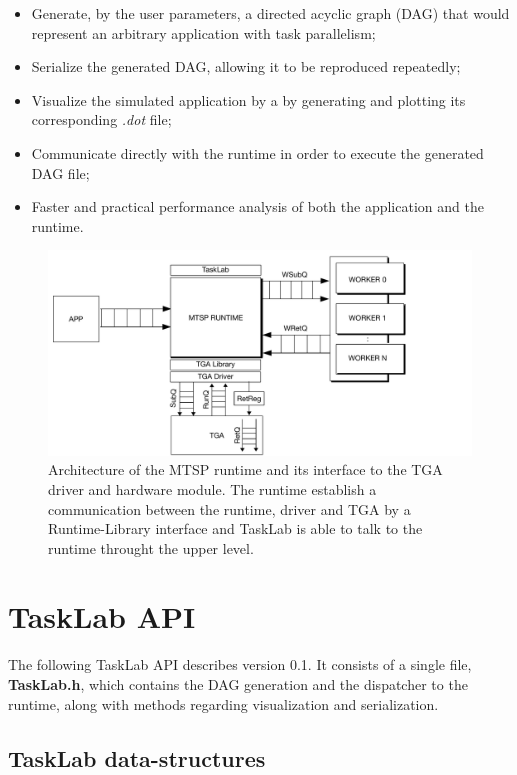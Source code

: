 \begin{itemize}
\item Generate, by the user parameters, a directed acyclic graph (DAG) that would represent an arbitrary application with task parallelism;
\item Serialize the generated DAG, allowing it to be reproduced repeatedly;
\item Visualize the simulated application by a by generating and plotting its corresponding \textit{.dot} file;
\item Communicate directly with the runtime in order to execute the generated DAG file;
\item Faster and practical performance analysis of both the application and the runtime.
\end{itemize}

\begin{figure}[ht]
  \centering
  \includegraphics[width=13cm]{figures/MTSP-Driver.pdf}
  \caption{Architecture of the MTSP runtime and its interface to the TGA driver \cite{TIOGA} and hardware module. The runtime establish a communication between the runtime, driver and TGA by a Runtime-Library interface and TaskLab is able to talk to the runtime throught the upper level. }
  \label{fig:arch}
\end{figure}

\section{TaskLab API}

The following TaskLab API describes version 0.1. It consists of a single file, \textbf{TaskLab.h}, which contains the DAG generation and the dispatcher to the runtime, along with methods regarding visualization and serialization.

\subsection{TaskLab data-structures} 


